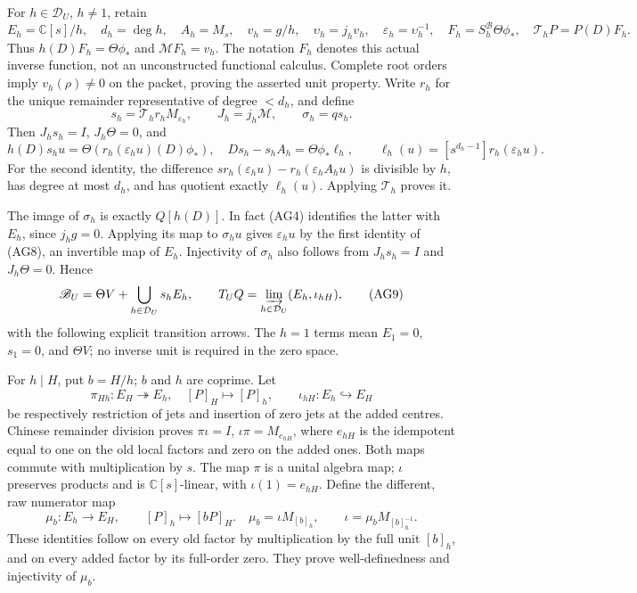 For $h\in\mathcal D_U$, $h\ne1$, retain
\[
 E_h=\mathbb C[s]/h,\quad d_h=\deg h,\quad A_h=M_s,\quad
 v_h=g/h,\quad \upsilon_h=j_hv_h,\quad
 \varepsilon_h=\upsilon_h^{-1},\quad
 F_h=S_h^{\mathscr B}\Theta\phi_*,\quad
 \mathcal T_hP=P(D)F_h.
 \tag{AG6}
\]
Thus $h(D)F_h=\Theta\phi_*$ and $\mathcal MF_h=v_h$.
The notation $F_h$ denotes this actual inverse function, not an
unconstructed functional calculus.  Complete root orders imply
$v_h(\rho)\ne0$ on the packet, proving the asserted unit property.
Write $r_h$ for the unique remainder representative of degree $<d_h$,
and define
\[
 s_h=\mathcal T_h r_h M_{\varepsilon_h},\qquad
 J_h=j_h\mathcal M,\qquad \sigma_h=qs_h.
 \tag{AG7}
\]
Then $J_hs_h=I$, $J_h\Theta=0$, and
\[
 h(D)s_hu=\Theta(r_h(\varepsilon_hu)(D)\phi_*),\quad
 D s_h-s_hA_h=\Theta\phi_*\ell_h,
 \qquad\ell_h(u)=[s^{d_h-1}]r_h(\varepsilon_hu).
 \tag{AG8}
\]
For the second identity, the difference
$s r_h(\varepsilon_hu)-r_h(\varepsilon_h A_hu)$ is divisible
by $h$, has degree at most $d_h$, and has quotient exactly
$\ell_h(u)$.  Applying $\mathcal T_h$ proves it.

The image of $\sigma_h$ is exactly $Q[h(D)]$.  In fact (AG4)
identifies the latter with $E_h$, since $j_hg=0$.  Applying its
map to $\sigma_hu$ gives $\varepsilon_hu$ by the first identity
of (AG8), an invertible map of $E_h$.  Injectivity of $\sigma_h$
also follows from $J_hs_h=I$ and $J_h\Theta=0$.  Hence
\[
 \mathscr B_U=\Theta V+\bigcup_{h\in\mathcal D_U}s_hE_h,
 \qquad
 T_UQ=\varinjlim_{h\in\mathcal D_U}(E_h,\iota_{hH}),
 \tag{AG9}
\]
with the following explicit transition arrows.  The $h=1$ terms
mean $E_1=0$, $s_1=0$, and $\Theta V$; no inverse unit is required
in the zero space.

For $h\mid H$, put $b=H/h$; $b$ and $h$ are coprime.  Let
\[
 \pi_{Hh}:E_H\twoheadrightarrow E_h,\quad[P]_H\mapsto[P]_h,
 \qquad
 \iota_{hH}:E_h\hookrightarrow E_H
 \tag{AG10}
\]
be respectively restriction of jets and insertion of zero jets at
the added centres.  Chinese remainder division proves
$\pi\iota=I$, $\iota\pi=M_{e_{hH}}$, where $e_{hH}$ is the
idempotent equal to one on the old local factors and zero on the
added ones.  Both maps commute with multiplication by $s$.
The map $\pi$ is a unital algebra map; $\iota$ preserves products
and is $\mathbb C[s]$-linear, with $\iota(1)=e_{hH}$.
Define the different, raw numerator map
\[
 \mu_b:E_h\to E_H,\qquad[P]_h\mapsto[bP]_H.
 \quad
 \mu_b=\iota M_{[b]_h},\qquad
 \iota=\mu_b M_{[b]_h^{-1}}.
 \tag{AG11}
\]
These identities follow on every old factor by multiplication by
the full unit $[b]_h$, and on every added factor by its full-order
zero.  They prove well-definedness and injectivity of $\mu_b$.

